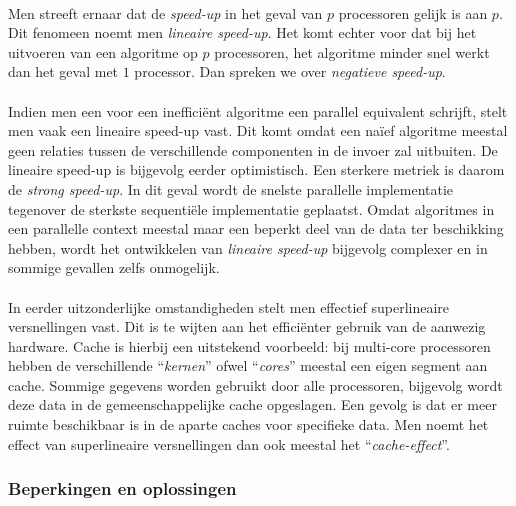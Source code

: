 \paragraph{}
Men streeft ernaar dat de \emph{speed-up} in het geval van $p$ processoren gelijk is aan $p$. Dit fenomeen noemt men \emph{lineaire speed-up}. Het komt echter voor dat bij het uitvoeren van een algoritme op $p$ processoren, het algoritme minder snel werkt dan het geval met $1$ processor. Dan spreken we over \emph{negatieve speed-up}.

\paragraph{}
Indien men een voor een ineffici\"ent algoritme een parallel equivalent schrijft, stelt men vaak een lineaire speed-up vast. Dit komt omdat een na\"ief algoritme meestal geen relaties tussen de verschillende componenten in de invoer zal uitbuiten. De lineaire speed-up is bijgevolg eerder optimistisch. Een sterkere metriek is daarom de \emph{strong speed-up}. In dit geval wordt de snelste parallelle implementatie tegenover de sterkste sequenti\"ele implementatie geplaatst. Omdat algoritmes in een parallelle context meestal maar een beperkt deel van de data ter beschikking hebben, wordt het ontwikkelen van \emph{lineaire speed-up} bijgevolg complexer en in sommige gevallen zelfs onmogelijk.

\paragraph{}
In eerder uitzonderlijke omstandigheden stelt men effectief superlineaire versnellingen vast. Dit is te wijten aan het effici\"enter gebruik van de aanwezig hardware. Cache is hierbij een uitstekend voorbeeld: bij multi-core processoren hebben de verschillende ``\emph{kernen}'' ofwel ``\emph{cores}'' meestal een eigen segment aan cache. Sommige gegevens worden gebruikt door alle processoren, bijgevolg wordt deze data in de gemeenschappelijke cache opgeslagen. Een gevolg is dat er meer ruimte beschikbaar is in de aparte caches voor specifieke data. Men noemt het effect van superlineaire versnellingen dan ook meestal het ``\emph{cache-effect}''\cite{cacheEffect}.

\subsubsection{Beperkingen en oplossingen}

